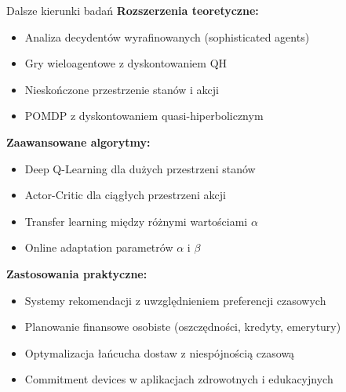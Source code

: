 \begin{frame}{Dalsze kierunki badań}
\textbf{Rozszerzenia teoretyczne:}
\begin{itemize}
    \item Analiza decydentów wyrafinowanych (sophisticated agents)
    \item Gry wieloagentowe z dyskontowaniem QH
    \item Nieskończone przestrzenie stanów i akcji
    \item POMDP z dyskontowaniem quasi-hiperbolicznym
\end{itemize}

\vspace{0.3em}
\textbf{Zaawansowane algorytmy:}
\begin{itemize}
    \item Deep Q-Learning dla dużych przestrzeni stanów
    \item Actor-Critic dla ciągłych przestrzeni akcji
    \item Transfer learning między różnymi wartościami $\alpha$
    \item Online adaptation parametrów $\alpha$ i $\beta$
\end{itemize}

\vspace{0.3em}
\textbf{Zastosowania praktyczne:}
\begin{itemize}
    \item Systemy rekomendacji z uwzględnieniem preferencji czasowych
    \item Planowanie finansowe osobiste (oszczędności, kredyty, emerytury)
    \item Optymalizacja łańcucha dostaw z niespójnością czasową
    \item Commitment devices w aplikacjach zdrowotnych i edukacyjnych
\end{itemize}
\end{frame}

